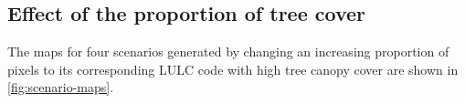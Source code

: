 \documentclass[10pt,letterpaper]{article}
\begin{document}
\subsection*{Effect of the proportion of tree cover}

The maps for four scenarios generated by changing an increasing proportion of pixels to its corresponding LULC code with high tree canopy cover are shown in \autoref{fig:scenario-maps}.
\end{document}
